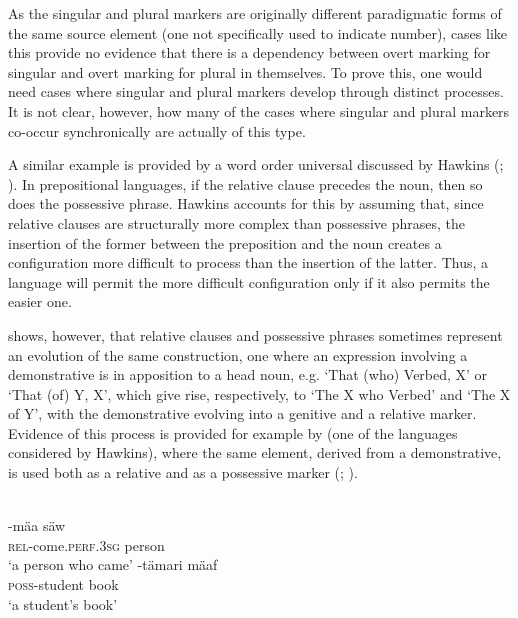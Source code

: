 \documentclass[output=paper]{langsci/langscibook}
\begin{document}
As the singular and plural markers are originally 
different
paradigmatic forms of the same source element (one not specifically
used to indicate number), cases like this provide no
evidence that there is a dependency between overt marking for
singular and overt marking for plural in themselves. 
To prove this,
one would need cases where singular and plural markers develop
through distinct processes. It is not clear, however, how many of the cases where
singular and plural markers co-occur synchronically are actually of
this type.

A similar example is provided by a word order universal discussed by
Hawkins (; ). In prepositional languages,  
 if the relative clause precedes the
noun, then so does the possessive phrase. Hawkins  accounts for this by
assuming that, since relative clauses are structurally more complex
than possessive phrases, the insertion of the former between the
preposition and the noun creates a configuration more difficult to
process than the insertion of the latter. Thus, a language will permit
the more difficult configuration only if it also permits the easier one. 

\citet{Aristar1991} shows, however, that relative clauses and
possessive phrases sometimes represent an evolution of the same construction,
 one
where an expression involving a demonstrative is in
apposition to a head noun, e.g. `That (who) Verbed, X' or `That (of) Y,
X', which give rise, respectively, to `The X who Verbed' and `The X of
Y', with the demonstrative evolving into a genitive and a relative
marker. Evidence of this process is provided for example by 
(one of the languages considered by Hawkins), where the
same element, derived from a demonstrative, is used both as a relative
and as a possessive marker (\citealt{AmharicCohen}; \citealt{Amharic}).


\ea\label{amharic}
\\
\ea
{}-mä{}{}a säw \\
\textsc{rel}-come.\textsc{perf}.\textsc{3sg} person \\
\glt `a person who came' \citep[81]{Amharic}
\ex
{}-t\"amari m\"a{}af \\
\textsc{poss}-student book  \\
\glt `a student's book' \citep[81]{Amharic}
\glend
\z
\z
{}
\end{document}
